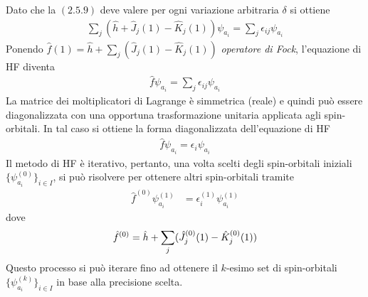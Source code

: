 \documentclass{article}
\begin{document}
Dato che la $(2.5.9)$ deve valere per ogni variazione arbitraria $\delta$ si ottiene 
\begin{align}
    \sum_j(\hat{h} + \hat{J}_j(1) - \hat{K}_j(1))\psi_{a_i} = \sum_j \epsilon_{ij}\psi_{a_i} \tag{2.5.12}
\end{align}
Ponendo $\hat{f}(1) = \hat{h} + \sum_j (\hat{J}_j(1) - \hat{K}_j(1))$ \textit{operatore di Fock}, l'equazione di HF diventa 
\begin{align}
    \hat{f}\psi_{a_i} = \sum_j \epsilon_{ij}\psi_{a_i} \tag{2.5.13}
\end{align}
La matrice dei moltiplicatori di Lagrange è simmetrica (reale) e quindi può essere diagonalizzata con una opportuna trasformazione unitaria applicata agli spin-orbitali. In tal caso si ottiene la forma diagonalizzata dell'equazione di HF 
\begin{align}
    \hat{f}\psi_{a_i} = \epsilon_i\psi_{a_i} \tag{2.5.14}
\end{align}
Il metodo di HF è iterativo, pertanto, una volta scelti degli spin-orbitali iniziali $\{\psi^{(0)}_{a_i}\}_{i \in I}$, si può risolvere per ottenere altri spin-orbitali tramite 
\begin{align}
    \hat{f}^{(0)}\psi^{(1)}_{a_i} &= \epsilon^{(1)}_{i}\psi^{(1)}_{a_i} \tag{2.5.15}
\end{align}
dove 
\begin{align}
    \hat{f}^{(0)} = \hat{h} + \sum_j (\hat{J}^{(0)}_j(1) - \hat{K}^{(0)}_j(1)) \notag
\end{align}
Questo processo si può iterare fino ad ottenere il $k$-esimo set di spin-orbitali $\{\psi^{(k)}_{a_i}\}_{i \in I}$ in base alla precisione scelta. 

\newpage
\end{document}
